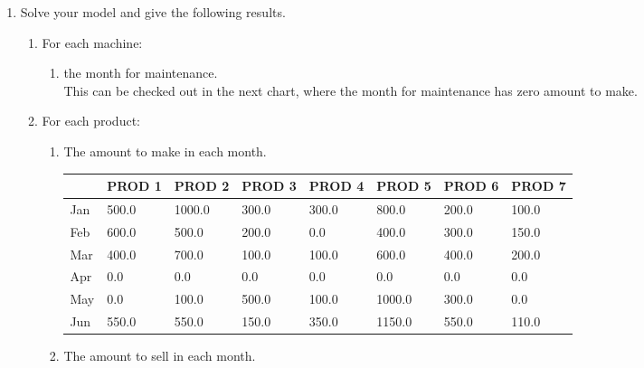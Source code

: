 \documentclass[12pt,a4paper]{article}
\theoremstyle{definition}
\begin{document}
\begin{enumerate}
\begin{enumerate}
    \item
    Solve your model and give the following results.
    \begin{enumerate}
    \item
    For each machine:
    \begin{enumerate}
    \item
    the month for maintenance.\\
    This can be checked out in the next chart, where the month for maintenance has zero amount to make.
    \end{enumerate}
    \item
    For each product:
    \begin{enumerate}
    \item
    The amount to make in each month.\\
    
     \begin{table}[htbp]
      \scriptsize
      \centering
      \renewcommand\arraystretch{1.1}
      \begin{tabular}{m{} m{}<{\centering} m{}<{\centering} m{}<{\centering} m{}<{\centering} m{}<{\centering} m{}<{\centering} m{}<{\centering}}
      \hline
       & \textbf{PROD 1} & \textbf{PROD 2} & \textbf{PROD 3} & \textbf{PROD 4} & \textbf{PROD 5} & \textbf{PROD 6} &  \textbf{PROD 7} \\\hline
    Jan	& 500.0	& 1000.0	& 300.0	& 300.0	& 800.0	& 200.0	& 100.0\\
    Feb	& 600.0	& 500.0	& 200.0	& 0.0	& 400.0	& 300.0	& 150.0\\
    Mar	& 400.0	& 700.0	& 100.0	& 100.0	& 600.0	& 400.0	& 200.0\\
    Apr	& 0.0	& 0.0	& 0.0	& 0.0	& 0.0	& 0.0	& 0.0\\
    May	& 0.0	& 100.0	& 500.0	& 100.0	& 1000.0	& 300.0	& 0.0\\
    Jun	& 550.0	& 550.0	& 150.0	& 350.0	& 1150.0	& 550.0	& 110.0\\

      \hline
      \end{tabular}
    \end{table}
    
    
    \item
    The amount to sell in each month.
    

\end{enumerate}
\end{enumerate}
\end{enumerate}
\end{enumerate}
\end{document}
